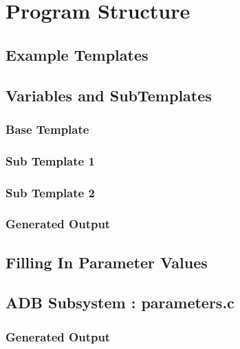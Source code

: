 \documentclass{settings/TU_Delft_Report}
\begin{document}
\chapter{Program Structure}


\begin{appendices}
\chapter{Example Templates}
\section{Variables and SubTemplates}
\subsection{Base Template}
\subsection{Sub Template 1}
\subsection{Sub Template 2}
\subsection{Generated Output}

\section{Filling In Parameter Values}

\section{ADB Subsystem : parameters.c}

\subsection{Generated Output}
\end{appendices}

\printbibliography
\end{document}
